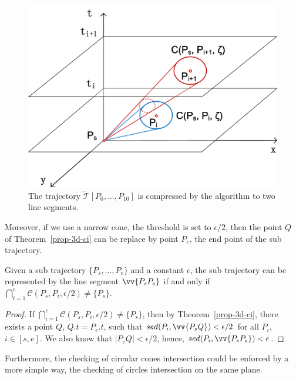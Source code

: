 \begin{figure}[tb!]
\centering
\includegraphics[scale=0.5]{figures/Fig-cis.png}
\vspace{-1ex}
\caption{\small The trajectory $\dddot{\mathcal{T}}[P_0, \ldots, P_{10}]$ is compressed by the \conei algorithm to two line segments.}
\vspace{-2ex}
\label{fig:cis}
\end{figure}


{Moreover, if we use a narrow cone, \ie the threshold is set to $\epsilon/2$, then the point $Q$ of Theorem~\ref{prop-3d-ci} can be replace by point $P_e$, the end point of the sub trajectory.}

\begin{cor}
\label{prop-3d-ci-half}
Given a sub trajectory $\{P_s, \ldots, P_e\}$ and a constant $\epsilon$, the sub trajectory can be represented by the line segment $\vv{P_sP_e}$  if and only if $\bigcap_{i=1}^{e}{\mathcal{C}(P_s, P_i, \epsilon/2)} \ne \{P_s\}$.
\end{cor}

\begin{proof}
If $\bigcap_{i=1}^{e}{\mathcal{C}(P_s, P_i, \epsilon/2)} \ne \{P_s\}$, then by Theorem~\ref{prop-3d-ci}, there exists a point $Q$, $Q.t = P_e.t$, such that $sed(P_i, \vv{P_sQ})<\epsilon/2$ for all $P_i$, $i \in [s,e]$. We also know that $|P_eQ| < \epsilon/2$, hence, $sed(P_i, \vv{P_sP_e})<\epsilon$.
\end{proof}


Furthermore, the checking of circular cones intersection could be enforced by a more simple way, \ie the checking of circles intersection on the same plane.

